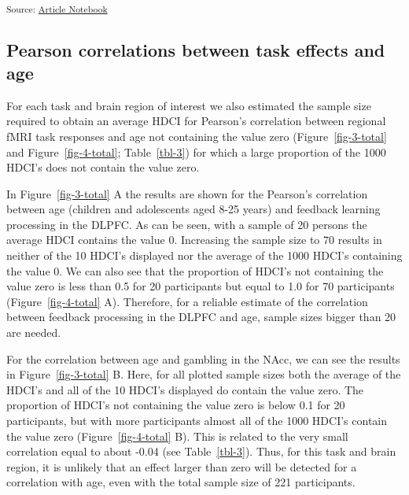 \documentclass[
  letterpaper,
  DIV=11,
  numbers=noendperiod]{scrartcl}
\begin{document}
\textsubscript{Source:
\href{https://eduardklap.github.io/sample-size-fmri/sample-size-fmri-paper.qmd.html}{Article
Notebook}}

\subsection{Pearson correlations between task effects and
age}\label{pearson-correlations-between-task-effects-and-age}

For each task and brain region of interest we also estimated the sample
size required to obtain an average HDCI for Pearson's correlation
between regional fMRI task responses and age not containing the value
zero (Figure~\ref{fig-3-total} and Figure~\ref{fig-4-total};
Table~\ref{tbl-3}) for which a large proportion of the 1000 HDCI's does
not contain the value zero.

In Figure~\ref{fig-3-total} A the results are shown for the Pearson's
correlation between age (children and adolescents aged 8-25 years) and
feedback learning processing in the DLPFC. As can be seen, with a sample
of 20 persons the average HDCI contains the value 0. Increasing the
sample size to 70 results in neither of the 10 HDCI's displayed nor the
average of the 1000 HDCI's containing the value 0. We can also see that
the proportion of HDCI's not containing the value zero is less than 0.5
for 20 participants but equal to 1.0 for 70 participants
(Figure~\ref{fig-4-total} A). Therefore, for a reliable estimate of the
correlation between feedback processing in the DLPFC and age, sample
sizes bigger than 20 are needed.

For the correlation between age and gambling in the NAcc, we can see the
results in Figure~\ref{fig-3-total} B. Here, for all plotted sample
sizes both the average of the HDCI's and all of the 10 HDCI's displayed
do contain the value zero. The proportion of HDCI's not containing the
value zero is below 0.1 for 20 participants, but with more participants
almost all of the 1000 HDCI's contain the value zero
(Figure~\ref{fig-4-total} B). This is related to the very small
correlation equal to about -0.04 (see Table~\ref{tbl-3}). Thus, for this
task and brain region, it is unlikely that an effect larger than zero
will be detected for a correlation with age, even with the total sample
size of 221 participants.
\end{document}

